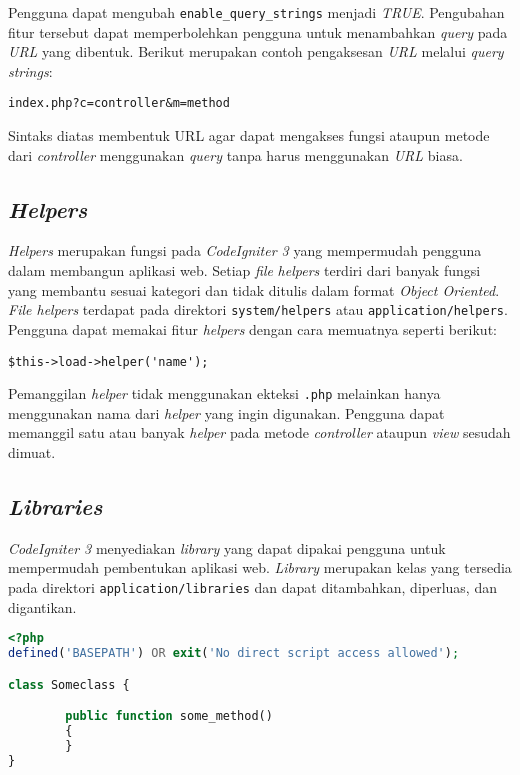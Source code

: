 Pengguna dapat mengubah \verb|enable_query_strings| menjadi \textit{TRUE}. Pengubahan fitur tersebut dapat memperbolehkan pengguna untuk menambahkan \textit{query} pada \textit{URL} yang dibentuk. Berikut merupakan contoh pengaksesan \textit{URL} melalui \textit{query strings}:

\begin{center}
\verb|index.php?c=controller&m=method|
\end{center}

Sintaks diatas membentuk URL agar dapat mengakses fungsi ataupun metode dari \textit{controller} menggunakan \textit{query} tanpa harus menggunakan \textit{URL} biasa.

\subsection{\textit{Helpers}}
\textit{Helpers} merupakan fungsi pada \textit{CodeIgniter 3}
yang mempermudah pengguna dalam membangun aplikasi web. Setiap \textit{file} \textit{helpers} terdiri dari banyak fungsi yang membantu sesuai kategori dan tidak ditulis dalam format \textit{Object Oriented}. \textit{File helpers} terdapat pada direktori \texttt{system/helpers} atau \texttt{application/helpers}. Pengguna dapat memakai fitur \textit{helpers} dengan cara memuatnya seperti berikut:

\begin{center}
\verb|$this->load->helper('name');|
\end{center}

Pemanggilan \textit{helper} tidak menggunakan ekteksi \texttt{.php} melainkan hanya menggunakan nama dari \textit{helper} yang ingin digunakan. Pengguna dapat memanggil satu atau banyak \textit{helper} pada metode \textit{controller} ataupun \textit{view} sesudah dimuat.

\subsection{\textit{Libraries}}
\textit{CodeIgniter 3} menyediakan \textit{library} yang dapat dipakai pengguna untuk mempermudah pembentukan aplikasi web. \textit{Library} merupakan kelas yang tersedia pada direktori \texttt{application/libraries} dan dapat ditambahkan, diperluas, dan digantikan. 

\begin{lstlisting}[language=PHP, caption=Contoh kelas \textit{library} pada \textit{CodeIgniter 3}, label=kode:libraryclass]
<?php
defined('BASEPATH') OR exit('No direct script access allowed');

class Someclass {

        public function some_method()
        {
        }
}
\end{lstlisting}

